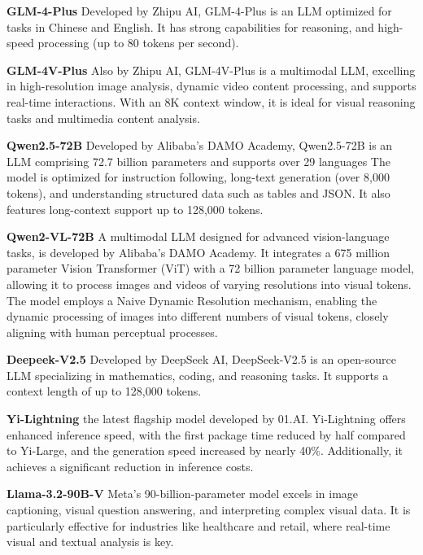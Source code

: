 \textbf{GLM-4-Plus} \cite{zhipu2024glm4plus} Developed by Zhipu AI, GLM-4-Plus is an LLM optimized for tasks in Chinese and English. It has strong capabilities for reasoning, and high-speed processing (up to 80 tokens per second).

\textbf{GLM-4V-Plus} \cite{zhipu2024glm4vplus} Also by Zhipu AI, GLM-4V-Plus is a multimodal LLM, excelling in high-resolution image analysis, dynamic video content processing, and supports real-time interactions. With an 8K context window, it is ideal for visual reasoning tasks and multimedia content analysis.

\textbf{Qwen2.5-72B} \cite{qwen2.5-72b} Developed by Alibaba's DAMO Academy, Qwen2.5-72B is an LLM comprising 72.7 billion parameters and supports over 29 languages The model is optimized for instruction following, long-text generation (over 8,000 tokens), and understanding structured data such as tables and JSON. It also features long-context support up to 128,000 tokens.

\textbf{Qwen2-VL-72B} \cite{Qwen2VL} A multimodal LLM designed for advanced vision-language tasks, is developed by Alibaba's DAMO Academy. It integrates a 675 million parameter Vision Transformer (ViT) with a 72 billion parameter language model, allowing it to process images and videos of varying resolutions into visual tokens. The model employs a Naive Dynamic Resolution mechanism, enabling the dynamic processing of images into different numbers of visual tokens, closely aligning with human perceptual processes.

\textbf{Deepeek-V2.5} \cite{deepseek2024v25} Developed by DeepSeek AI, DeepSeek-V2.5 is an open-source LLM specializing in mathematics, coding, and reasoning tasks. It supports a context length of up to 128,000 tokens.

\textbf{Yi-Lightning} \cite{01ai2024yilightning} the latest flagship model developed by 01.AI. Yi-Lightning offers enhanced inference speed, with the first package time reduced by half compared to Yi-Large, and the generation speed increased by nearly 40\%. Additionally, it achieves a significant reduction in inference costs.


\textbf{Llama-3.2-90B-V} \cite{meta_llama32_2024} Meta’s 90-billion-parameter model excels in image captioning, visual question answering, and interpreting complex visual data. It is particularly effective for industries like healthcare and retail, where real-time visual and textual analysis is key.

